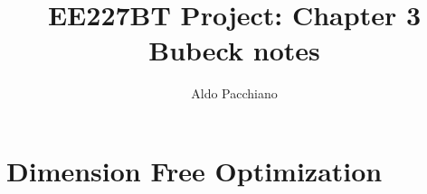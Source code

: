 \documentclass{article}
\title{EE227BT Project:
Chapter 3 Bubeck notes}
\author{Aldo Pacchiano}
\begin{document}
\maketitle


\section{Dimension Free Optimization}







\end{document}

